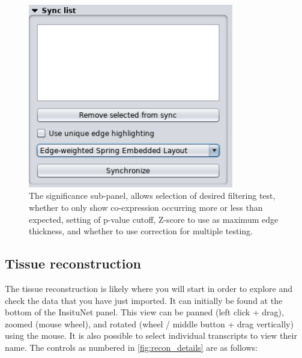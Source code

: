\documentclass[a4paper,12pt]{article}
\begin{document}
\begin{figure}[htb]
	\caption{The significance sub-panel, allows selection of desired filtering test, whether to only show co-expression occurring more or less than expected, setting of p-value cutoff, Z-score to use as maximum edge thickness, and whether to use correction for multiple testing.}\label{fig:sig}
	\centering
	\includegraphics[width=0.8\textwidth]{sync}
\end{figure}

\subsection{Tissue reconstruction}
The tissue reconstruction is likely where you will start in order to explore and check the data that you have just imported. It can initially be found at the bottom of the InsituNet panel. This view can be panned (left click + drag), zoomed (mouse wheel), and rotated (wheel / middle button + drag vertically) using the mouse. It is also possible to select individual transcripts to view their name. The controls as numbered in \ref{fig:recon_details} are as follows:
\end{document}

